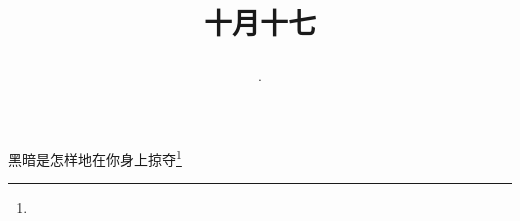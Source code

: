 \title{\date[d=17,m=11,y=2024][year:cn-y,年,month:cn,day:cn,日,·,weekday]·十月十七 }
黑暗是怎样地在你身上掠夺\footnote{ }

